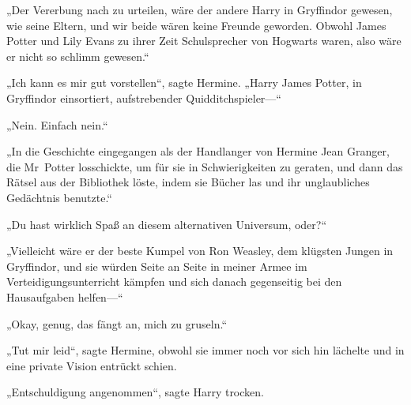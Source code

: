 „Der Vererbung nach zu urteilen, wäre der andere Harry in Gryffindor gewesen, wie seine Eltern, und wir beide wären keine Freunde geworden. Obwohl James Potter und Lily Evans zu ihrer Zeit Schulsprecher von Hogwarts waren, also wäre er nicht so schlimm gewesen.“

„Ich kann es mir gut vorstellen“, sagte Hermine. „Harry James Potter, in Gryffindor einsortiert, aufstrebender Quidditchspieler—“

„Nein. Einfach nein.“

„In die Geschichte eingegangen als der Handlanger von Hermine Jean Granger, die Mr~Potter losschickte, um für sie in Schwierigkeiten zu geraten, und dann das Rätsel aus der Bibliothek löste, indem sie Bücher las und ihr unglaubliches Gedächtnis benutzte.“

„Du hast wirklich Spaß an diesem alternativen Universum, oder?“

„Vielleicht wäre er der beste Kumpel von Ron Weasley, dem klügsten Jungen in Gryffindor, und sie würden Seite an Seite in meiner Armee im Verteidigungsunterricht kämpfen und sich danach gegenseitig bei den Hausaufgaben helfen—“

„Okay, genug, das fängt an, mich zu gruseln.“

„Tut mir leid“, sagte Hermine, obwohl sie immer noch vor sich hin lächelte und in eine private Vision entrückt schien.

„Entschuldigung angenommen“, sagte Harry trocken.

